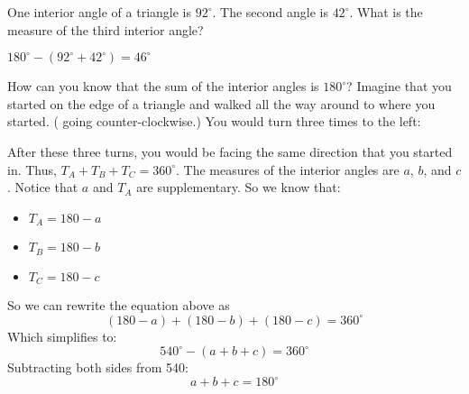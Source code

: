 \begin{Exercise}[title={Missing Angle}, label=missing_angle]
One interior angle of a triangle is $92^\circ$. The second angle is $42^\circ$. What is the measure of the third interior angle?
\end{Exercise}
\begin{Answer}[ref=missing_angle]
$180^\circ - (92^\circ + 42^\circ) = 46^\circ$
\end{Answer}

How can you know that the sum of the interior angles is $180^\circ$?
Imagine that you started on the edge of a triangle and walked all the
way around to where you started. ( going
counter-clockwise.) You would turn three times to the left:


After these three turns, you would be facing the same direction that
you started in. Thus, $T_A + T_B + T_C = 360^\circ$. The
measures of the interior angles are $a$, $b$, and $c$. Notice that $a$ and
$T_A$ are supplementary. So we know that:
\begin{itemize}
\item $T_A = 180 - a$
\item $T_B = 180 - b$
\item $T_C = 180 - c$
\end{itemize}
So we can rewrite the equation above as
\begin{equation*}
  (180 - a) + (180 - b) + (180 - c) = 360^\circ
\end{equation*}
Which simplifies to:
\begin{equation*}
  540^\circ - (a + b + c) = 360^\circ
\end{equation*}
Subtracting both sides from 540:
\begin{equation*}
  a + b + c = 180^\circ
\end{equation*}

